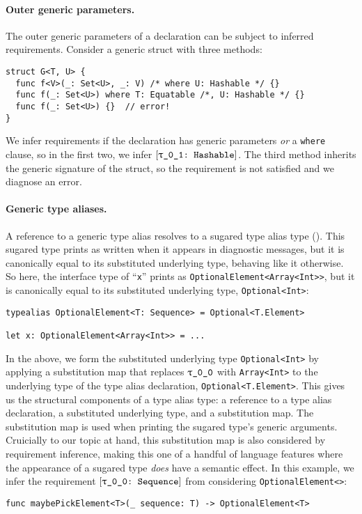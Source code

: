 \documentclass[../generics]{subfiles}
\begin{document}
\paragraph{Outer generic parameters.}
The outer generic parameters of a declaration can be subject to inferred requirements. Consider a generic struct with three methods:
\begin{Verbatim}
struct G<T, U> {
  func f<V>(_: Set<U>, _: V) /* where U: Hashable */ {}
  func f(_: Set<U>) where T: Equatable /*, U: Hashable */ {}
  func f(_: Set<U>) {}  // error!
}
\end{Verbatim}
We infer requirements if the declaration has generic parameters \emph{or} a \texttt{where} clause, so in the first two, we infer $\ConfReq{\rU}{Hashable}$. The third method inherits the generic signature of the struct, so the requirement is not satisfied and we diagnose an error.

\paragraph{Generic type aliases.}
A reference to a generic type alias resolves to a sugared type alias type (). This sugared type prints as written when it appears in diagnostic messages, but it is canonically equal to its substituted underlying type, behaving like it otherwise. So here, the interface type of ``\texttt{x}'' prints as \texttt{OptionalElement<Array<Int>>}, but it is canonically equal to its substituted underlying type, \texttt{Optional<Int>}:
\begin{Verbatim}
typealias OptionalElement<T: Sequence> = Optional<T.Element>

let x: OptionalElement<Array<Int>> = ...
\end{Verbatim}

In the above, we form the substituted underlying type \texttt{Optional<Int>} by applying a substitution map that replaces $\rT$ with \texttt{Array<Int>} to the underlying type of the type alias declaration, \texttt{Optional<T.Element>}. This gives us the structural components of a type alias type: a reference to a type alias declaration, a substituted underlying type, and a substitution map. The substitution map is used when printing the sugared type's generic arguments. Cruicially to our topic at hand, this substitution map is also considered by requirement inference, making this one of a handful of language features where the appearance of a sugared type \emph{does} have a semantic effect. In this example, we infer the requirement $\ConfReq{\rT}{Sequence}$ from considering \texttt{OptionalElement<\rT>}:
\begin{Verbatim}
func maybePickElement<T>(_ sequence: T) -> OptionalElement<T>
\end{Verbatim}
\end{document}
